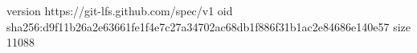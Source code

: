 version https://git-lfs.github.com/spec/v1
oid sha256:d9f11b26a2e63661fe1f4e7c27a34702ac68db1f886f31b1ac2e84686e140e57
size 11088
